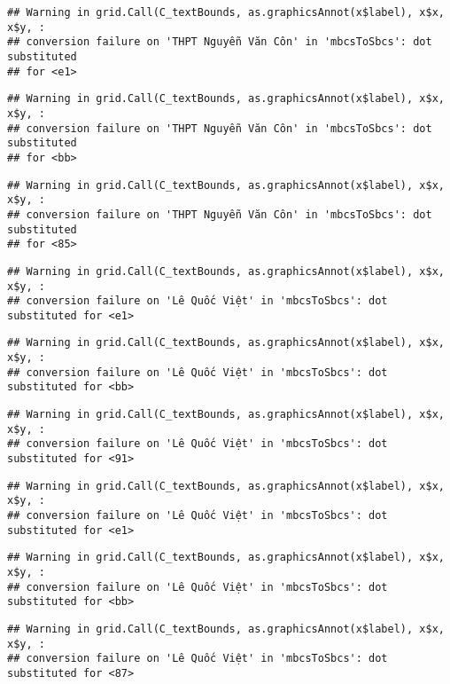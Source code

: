 \documentclass[
]{article}
\begin{document}
\begin{verbatim}
## Warning in grid.Call(C_textBounds, as.graphicsAnnot(x$label), x$x, x$y, :
## conversion failure on 'THPT Nguyễn Văn Côn' in 'mbcsToSbcs': dot substituted
## for <e1>
\end{verbatim}

\begin{verbatim}
## Warning in grid.Call(C_textBounds, as.graphicsAnnot(x$label), x$x, x$y, :
## conversion failure on 'THPT Nguyễn Văn Côn' in 'mbcsToSbcs': dot substituted
## for <bb>
\end{verbatim}

\begin{verbatim}
## Warning in grid.Call(C_textBounds, as.graphicsAnnot(x$label), x$x, x$y, :
## conversion failure on 'THPT Nguyễn Văn Côn' in 'mbcsToSbcs': dot substituted
## for <85>
\end{verbatim}

\begin{verbatim}
## Warning in grid.Call(C_textBounds, as.graphicsAnnot(x$label), x$x, x$y, :
## conversion failure on 'Lê Quốc Việt' in 'mbcsToSbcs': dot substituted for <e1>
\end{verbatim}

\begin{verbatim}
## Warning in grid.Call(C_textBounds, as.graphicsAnnot(x$label), x$x, x$y, :
## conversion failure on 'Lê Quốc Việt' in 'mbcsToSbcs': dot substituted for <bb>
\end{verbatim}

\begin{verbatim}
## Warning in grid.Call(C_textBounds, as.graphicsAnnot(x$label), x$x, x$y, :
## conversion failure on 'Lê Quốc Việt' in 'mbcsToSbcs': dot substituted for <91>
\end{verbatim}

\begin{verbatim}
## Warning in grid.Call(C_textBounds, as.graphicsAnnot(x$label), x$x, x$y, :
## conversion failure on 'Lê Quốc Việt' in 'mbcsToSbcs': dot substituted for <e1>
\end{verbatim}

\begin{verbatim}
## Warning in grid.Call(C_textBounds, as.graphicsAnnot(x$label), x$x, x$y, :
## conversion failure on 'Lê Quốc Việt' in 'mbcsToSbcs': dot substituted for <bb>
\end{verbatim}

\begin{verbatim}
## Warning in grid.Call(C_textBounds, as.graphicsAnnot(x$label), x$x, x$y, :
## conversion failure on 'Lê Quốc Việt' in 'mbcsToSbcs': dot substituted for <87>
\end{verbatim}
\end{document}
